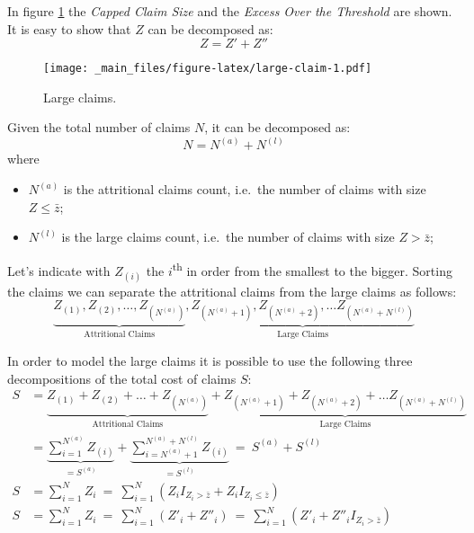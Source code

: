 \documentclass[a4paper, twoside, openright, 12pt]{report}
\providecommand{\tightlist}{%
  \setlength{\itemsep}{0pt}\setlength{\parskip}{0pt}}
\theoremstyle{definition}
\theoremstyle{definition}
\theoremstyle{definition}
\theoremstyle{remark}
\begin{document}
In figure \ref{fig:large-claim} the \emph{Capped Claim Size} and the \emph{Excess Over the Threshold} are shown. It is easy to show that \(Z\) can be decomposed as:
\[Z = Z' + Z''\]

\begin{figure}
\centering
\texttt{[image: \_main\_files/figure-latex/large-claim-1.pdf]}
\caption{\label{fig:large-claim}Large claims.}
\end{figure}

Given the total number of claims \(N\), it can be decomposed as:
\[N = N^{(a)} + N^{(l)}\]
where

\begin{itemize}
\tightlist
\item
  \(N^{(a)}\) is the attritional claims count, i.e.~the number of claims with size \(Z \le \bar{z}\);
\item
  \(N^{(l)}\) is the large claims count, i.e.~the number of claims with size \(Z > \bar{z}\);
\end{itemize}

Let's indicate with \(Z_{(i)}\) the \(i\)\textsuperscript{th} in order from the smallest to the bigger. Sorting the claims we can separate the attritional claims from the large claims as follows:
\[
\underbrace{Z_{(1)}, Z_{(2)}, \dots, Z_{(N^{(a)})}}_{\text{Attritional Claims}},
\underbrace{Z_{(N^{(a)} + 1)}, Z_{(N^{(a)} + 2)}, \dots Z_{(N^{(a)} + N^{(l)})}}_{\text{Large Claims}}
\]

In order to model the large claims it is possible to use the following three decompositions of the total cost of claims \(S\):
\begin{align}
  \nonumber
  S & = \underbrace{Z_{(1)} + Z_{(2)} + \dots + Z_{(N^{(a)})}}_{\text{Attritional Claims}} +
        \underbrace{Z_{(N^{(a)} + 1)} + Z_{(N^{(a)} + 2)} + \dots Z_{(N^{(a)} + N^{(l)})}}_{\text{Large Claims}} \\
  \label{large-claim-decomposition-1}
    & = \underbrace{\sum_{i=1}^{N^{(a)}}{Z_{(i)}}}_{=S^{(a)}} +
            \underbrace{\sum_{i = N^{(a)} + 1}^{N^{(a)} + N^{(l)}}{Z_{(i)}}}_{=S^{(l)}}
    \ = \ S^{(a)} + S^{(l)} \\[12pt]
  \label{large-claim-decomposition-2}
  S & = \sum_{i=1}^{N}{Z_i}
    \ = \ \sum_{i=1}^{N}{\left(
      Z_i I_{Z_i>\bar{z}} +
      Z_i I_{Z_i\le\bar{z}}
      \right)} \\[12pt]
  \label{large-claim-decomposition-3}
  S & = \sum_{i=1}^{N}{Z_i}
    \ = \ \sum_{i=1}^{N}{\left(Z'_i + Z''_i\right)}
    \ = \ \sum_{i=1}^{N}{\left(Z'_i + Z''_i I_{Z_i > \bar{z}}\right)}
\end{align}
\end{document}
